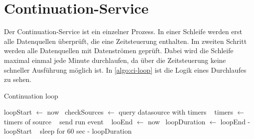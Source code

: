 \section{Continuation-Service}

Der Continuation-Service ist ein einzelner Prozess.
In einer Schleife werden erst alle Datenquellen überprüft, die eine Zeitsteuerung enthalten.
Im zweiten Schritt werden alle Datenquellen mit Datenströmen geprüft.
Dabei wird die Schleife maximal einmal jede Minute durchlaufen, da über die Zeitsteuerung keine schneller Ausführung möglich ist.
In \cref{algo:ci-loop} ist die Logik eines Durchlaufes zu sehen.

\begin{algorithm}
\caption{Continuation loop}
\label{algo:ci-loop}
loopStart $\gets$ now \
checkSources $\gets$ query datasource with timers \
 {
    timers $\gets$ timers of source \
     {
        \If {timer is now} {
             {
                send run event \
            }
        }
    }
}
looEnd $\gets$ now \
loopDuration $\gets$ loopEnd - loopStart \
 {
    sleep for 60 sec - loopDuration \
}

\end{algorithm}

